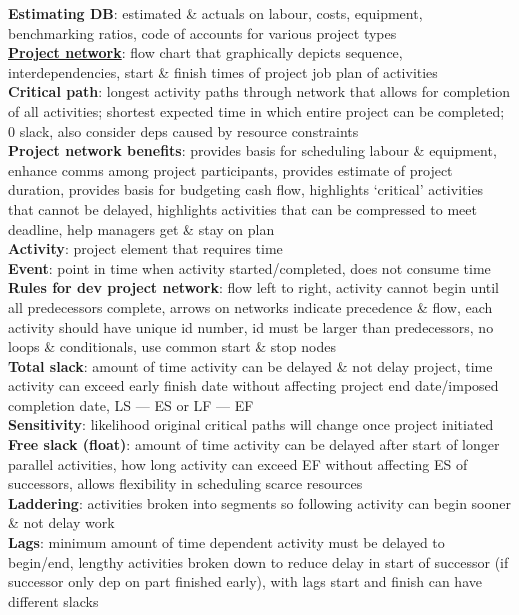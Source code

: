 \documentclass[a4paper]{article}
\begin{document}
\begin{multicols}{3}
        \textbf{Estimating DB}: estimated \& actuals on labour, costs, equipment, benchmarking ratios, code of accounts for various project types\\
        \underline{\textbf{Project network}}: flow chart that graphically depicts sequence, interdependencies, start \& finish times of project job plan of activities\\
        \textbf{Critical path}: longest activity paths through network that allows for completion of all activities; shortest expected time in which entire project can be completed; 0 slack, also consider deps caused by resource constraints\\
        \textbf{Project network benefits}: provides basis for scheduling labour \& equipment, enhance comms among project participants, provides estimate of project duration, provides basis for budgeting cash flow, highlights `critical' activities that cannot be delayed, highlights activities that can be compressed to meet deadline, help managers get \& stay on plan\\
        \textbf{Activity}: project element that requires time\\
        \textbf{Event}: point in time when activity started/completed, does not consume time\\
        \textbf{Rules for dev project network}: flow left to right, activity cannot begin until all predecessors complete, arrows on networks indicate precedence \& flow, each activity should have unique id number, id must be larger than predecessors, no loops \& conditionals, use common start \& stop nodes\\
        \textbf{Total slack}: amount of time activity can be delayed \& not delay project, time activity can exceed early finish date without affecting project end date/imposed completion date, LS --- ES or LF --- EF\\
        \textbf{Sensitivity}: likelihood original critical paths will change once project initiated\\
        \textbf{Free slack (float)}: amount of time activity can be delayed after start of longer parallel activities, how long activity can exceed EF without affecting ES of successors, allows flexibility in scheduling scarce resources\\
        \textbf{Laddering}: activities broken into segments so following activity can begin sooner \& not delay work\\
        \textbf{Lags}: minimum amount of time dependent activity must be delayed to begin/end, lengthy activities broken down to reduce delay in start of successor (if successor only dep on part finished early), with lags start and finish can have different slacks\\

\end{multicols}
\end{document}
